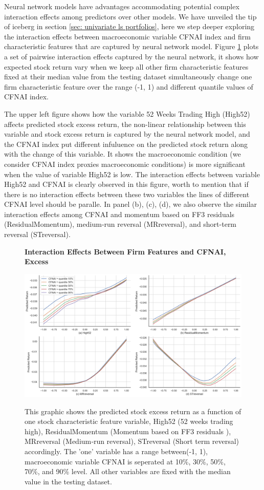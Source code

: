 Neural network models have advantages accommodating potential complex interaction effects among predictors over other models. We have unveiled the tip of iceberg in section \ref{sec: univariate ls portfolios}, here we step deeper exploring the interaction effects between macroeconomic variable CFNAI index and firm characteristic features that are captured by neural network model. Figure \ref{fig: interaction effect_ex} plots a set of pairwise interaction effects captured by the neural network, it shows how expected stock return vary when we keep all other firm characteristic features fixed at their median value from the testing dataset simultaneously change one firm characteristic feature over the range (-1, 1) and different quantile values of CFNAI index. 

The upper left figure shows how the variable 52 Weeks Trading High (High52) affects predicted stock excess return, the non-linear relationship between this variable and stock excess return is captured by the neural network model, and the CFNAI index put different infuluence on the predicted stock return along with the change of this variable. It shows the macroeconomic condition (we consider CFNAI index proxies macroeconomic conditions) is more significant when the value of variable High52 is low. The interaction effects between variable High52 and CFNAI is clearly observed in this figure, worth to mention that if there is no interaction effects between these two variables the lines of different CFNAI level should be paralle. In panel (b), (c), (d), we also observe the similar interaction effects among CFNAI and momentum based on FF3 residuals (ResidualMomentum), medium‐run reversal (MRreversal), and short-term reversal (STreversal).

\begin{figure}[H]
  \centering
  \caption{\textbf{Interaction Effects Between Firm Features and CFNAI, Excess}}
  \includegraphics[width=.8\textwidth]{images/interactive_effect_excess.png}
  \label{fig: interaction effect_ex}
  \caption*{\footnotesize{This graphic shows the predicted stock excess return as a function of one stock characteristic feature variable, High52 (52 weeks trading high), ResidualMomentum (Momentum based on FF3 residuals  ), MRreversal (Medium‐run reversal), STreversal (Short term reversal) accordingly. The 'one' variable has a range between(-1, 1), macroeconomic variable CFNAI is seperated at 10\%, 30\%, 50\%, 70\%, and 90\% level. All other variables are fixed with the median value in the testing dataset.}}
\end{figure}

